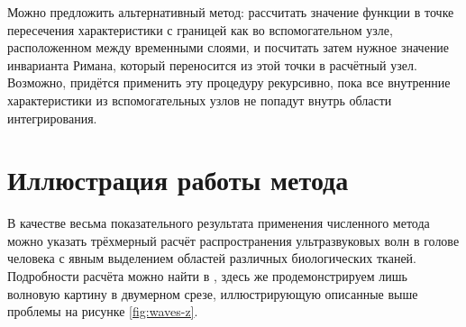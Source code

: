 \documentclass[a4paper]{article}
\numberwithin{equation}{section}
\begin{document}
Можно предложить альтернативный метод: рассчитать значение функции в точке пересечения 
характеристики с границей как во вспомогательном узле, 
расположенном между временными слоями, и посчитать затем нужное значение 
инварианта Римана, который переносится из этой точки в расчётный узел. 
Возможно, придётся применить эту процедуру рекурсивно, 
пока все внутренние характеристики из вспомогательных узлов не попадут внутрь 
области интегрирования. 


\section{Иллюстрация работы метода}
В качестве весьма показательного результата применения численного метода можно 
указать трёхмерный расчёт распространения ультразвуковых волн в голове человека 
с явным выделением областей различных биологических тканей. 
Подробности расчёта можно найти в \cite{skull}, здесь же продемонстрируем лишь 
волновую картину в двумерном срезе, иллюстрирующую описанные выше проблемы 
на рисунке \ref{fig:waves-z}. 
\end{document}
